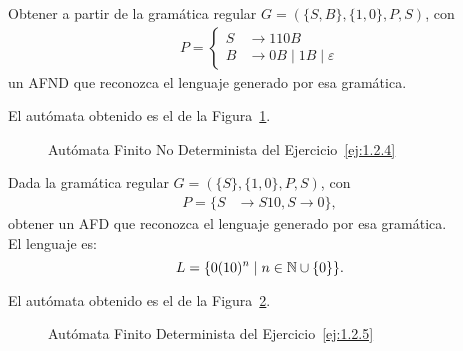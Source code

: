 \begin{ejercicio} \label{ej:1.2.4}
    Obtener a partir de la gramática regular $G = (\{S, B\}, \{1, 0\}, P, S)$, con
    \begin{align*}
        P = \left\{
            \begin{aligned}
                S &\to 110B \\
                B &\to 0B \mid 1B \mid \varepsilon
            \end{aligned}
        \right.
    \end{align*}
    un AFND que reconozca el lenguaje generado por esa gramática.

    El autómata obtenido es el de la Figura~\ref{fig:ej:1.2.4}.
    \begin{figure}[H]
        \centering
        \caption{Autómata Finito No Determinista del Ejercicio~\ref{ej:1.2.4}}
        \label{fig:ej:1.2.4}
    \end{figure}
\end{ejercicio}

\begin{ejercicio} \label{ej:1.2.5}
    Dada la gramática regular $G = (\{S\}, \{1, 0\}, P, S)$, con
    \begin{align*}
        P = \{S &\to S10, S \to 0\},
    \end{align*}
    obtener un AFD que reconozca el lenguaje generado por esa gramática.\\

    El lenguaje es:
    \begin{equation*}
        L = \{0(10)^n \mid n\in \mathbb{N}\cup \{0\}\}.
    \end{equation*}

    El autómata obtenido es el de la Figura~\ref{fig:ej:1.2.5}.
    \begin{figure}[H]
        \centering
        \caption{Autómata Finito Determinista del Ejercicio~\ref{ej:1.2.5}}
        \label{fig:ej:1.2.5}
    \end{figure}
\end{ejercicio}


